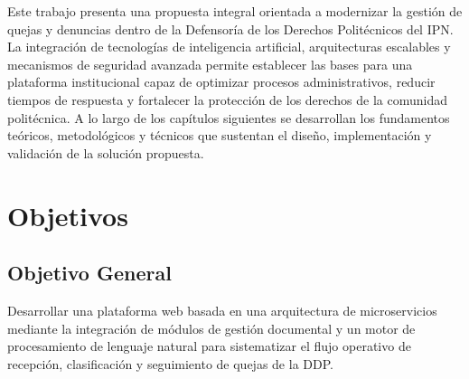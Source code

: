 Este trabajo presenta una propuesta integral orientada a modernizar la gestión de quejas y denuncias dentro de la Defensoría de los Derechos Politécnicos del IPN. La integración de tecnologías de inteligencia artificial, arquitecturas escalables y mecanismos de seguridad avanzada permite establecer las bases para una plataforma institucional capaz de optimizar procesos administrativos, reducir tiempos de respuesta y fortalecer la protección de los derechos de la comunidad politécnica. A lo largo de los capítulos siguientes se desarrollan los fundamentos teóricos, metodológicos y técnicos que sustentan el diseño, implementación y validación de la solución propuesta.


\section{Objetivos}

\subsection{Objetivo General}
Desarrollar una plataforma web basada en una arquitectura de microservicios mediante la integración de módulos de gestión documental y un motor de procesamiento de lenguaje natural para sistematizar el flujo operativo de recepción, clasificación y seguimiento de quejas de la DDP.

